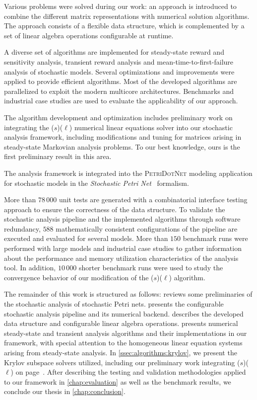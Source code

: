 Various problems were solved during our work: an approach is
introduced to combine the different matrix representations with
numerical solution algorithms. The approach consists of a flexible
data structure, which is complemented by a set of linear algebra
operations configurable at runtime.

A diverse set of algorithms are implemented for steady-state reward
and sensitivity analysis, transient reward analysis and
mean-time-to-first-failure analysis of stochastic models. Several
optimizations and improvements were applied to provide efficient
algorithms. Most of the developed algorithms are parallelized to
exploit the modern multicore architectures. Benchmarks and industrial
case studies are used to evaluate the applicability of our approach.

The algorithm development and optimization includes preliminary work
on integrating the ($s$)($\ell$) numerical
linear equations solver into our stochastic analysis framework,
including modifications and tuning for matrices arising in
steady-state Markovian analysis problems. To our best knowledge, ours
is the first preliminary result in this area.

The analysis framework is integrated into the \textsc{PetriDotNet}
modeling application for stochastic models in the \emph{Stochastic
  Petri Net}~ formalism.

More than $78\,000$ unit tests are generated with a combinatorial
interface testing approach to ensure the correctness of the data
structure. To validate the stochastic analysis pipeline and the
implemented algorithms through software redundancy, $588$
mathematically consistent configurations of the pipeline are executed
and evaluated for several models. More than $150$ benchmark runs were
performed with large models and industrial case studies to gather
information about the performance and memory utilization
characteristics of the analysis tool. In addition, $10\,000$ shorter
benchmark runs were used to study the convergence behavior of our
modification of the ($s$)($\ell$) algorithm.

The remainder of this work is structured as follows:
 reviews some preliminaries of the stochastic
analysis of stochastic Petri nets.  presents the
configurable stochastic analysis pipeline and its numerical
backend.  describes the developed data structure
and configurable linear algebra operations. 
presents numerical steady-state and transient analysis algorithms and
their implementations in our framework, with special attention to the
homogeneous linear equation systems arising from steady-state
analysis. In \vref{ssec:algorithms:krylov}, we present the Krylov
subspace solvers utilized, including our preliminary work integrating
($s$)($\ell$) on
page~\pageref{ssec:algorithms:idrstab}. After describing the testing
and validation methodologies applied to our framework in
\cref{chap:evaluation} as well as the benchmark results, we conclude
our thesis in \cref{chap:conclusion}.

